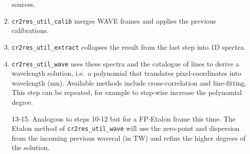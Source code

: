 \begin{enumerate}
          sources.
    \item \texttt{cr2res\_util\_calib} merges WAVE frames and applies the
          previous calibrations.
    \item \texttt{cr2res\_util\_extract} collapses the result from the last step
          into 1D spectra.
    \item \texttt{cr2res\_util\_wave} uses these spectra and the catalogue of
          lines to derive a wavelength solution, i.e.~a polynomial that
          translates pixel-coordinates into wavelength (nm). Available methods
          include cross-correlation and line-fitting. This step can be repeated,
          for example to step-wise increase the polynomial degree.
    \item[13-15.] Analogous to steps 10-12 but for a FP-Etalon frame this time.
          The Etalon method of \texttt{cr2res\_util\_wave} will use the
          zero-point and dispersion from the incoming previous wavecal (in TW)
          and refine the higher degrees of the solution.
\end{enumerate}
